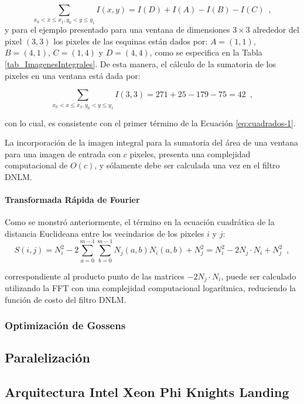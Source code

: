 \begin{equation}
\sum_{x_{0}<x\leq x_{1},y_{0}<y\leq y_{1}}I\left(x,y\right)=I\left(D\right)+I\left(A\right)-I\left(B\right)-I\left(C\right) \enspace ,
\end{equation}
y para el ejemplo presentado para una ventana de dimensiones $3\times3$ alrededor del pixel $(3,3)$ los pixeles de las esquinas est\'an dados por: $A=\left(1,1\right)$, $B=\left(4,1\right)$,
$C=\left(1,4\right)$ y $D=\left(4,4\right)$, como se especifica en la Tabla \ref{tab_ImagenesIntegrales}. De esta manera, el c\'alculo de la sumatoria de los pixeles en una ventana est\'a dada por: 

\begin{equation}
\sum_{x_{0}<x\leq x_{1},y_{0}<y\leq y_{1}}I\left(3,3\right)=271+25-179-75=42 \enspace ,
\end{equation}

con lo cual, es consistente con el primer t\'ermino de la Ecuaci\'on \ref{eq:cuadrados-1}. 

La incorporaci\'on de la imagen integral para la sumatoria del \'area de una ventana para una imagen de entrada con $c$ pixeles, presenta una complejidad computacional de $O(c)$, y s\'olamente debe ser calculada una vez en el filtro DNLM.


\paragraph{Transformada R\'apida de Fourier}

Como se monstr\'o anteriormente, el t\'ermino en la ecuaci\'on cuadr\'atica de la distancia Euclideana entre los vecindarios de los pixeles $i$ y $j$:
\begin{equation}
S\left(i,j\right)=N_{i}^{2}-2\sum_{a=0}^{m-1}\sum_{b=0}^{m-1}N_{j}\left(a,b\right)N_{i}\left(a,b\right)+N_{j}^{2} =N_{i}^{2}-2N_{j}\cdot N_{i}+N_{j}^{2} \enspace , 
\end{equation}



correspondiente al producto punto de las matrices $-2N_{j}\cdot N_{i}$,  puede ser calculado utilizando la FFT con una complejidad computacional logar\'itmica, reduciendo la funci\'on de costo del filtro DNLM. 



\subsubsection{Optimizaci\'on de Gossens}
\label{ch:marco_gossens}

\subsection{Paralelizaci\'on}
\label{ch:marco_parallel}

\subsection{Arquitectura Intel Xeon Phi Knights Landing}
\label{ch:marco_xeonphi}
